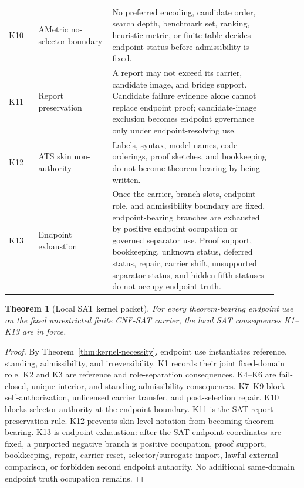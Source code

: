 \documentclass[11pt]{article}
\newtheorem{theorem}{Theorem}[section]
\theoremstyle{definition}
\theoremstyle{remark}
\begin{document}
\begin{longtable}{>{\raggedright\arraybackslash}p{0.10\linewidth}>{\raggedright\arraybackslash}p{0.25\linewidth}>{\raggedright\arraybackslash}p{0.56\linewidth}}
K10 & AMetric no-selector boundary & No preferred encoding, candidate order, search depth, benchmark set, ranking, heuristic metric, or finite table decides endpoint status before admissibility is fixed. \\
K11 & Report preservation & A report may not exceed its carrier, candidate image, and bridge support. Candidate failure evidence alone cannot replace endpoint proof; candidate-image exclusion becomes endpoint governance only under endpoint-resolving use. \\
K12 & ATS skin non-authority & Labels, syntax, model names, code orderings, proof sketches, and bookkeeping do not become theorem-bearing by being written. \\
K13 & Endpoint exhaustion & Once the carrier, branch slots, endpoint role, and admissibility boundary are fixed, endpoint-bearing branches are exhausted by positive endpoint occupation or governed separator use. Proof support, bookkeeping, unknown status, deferred status, repair, carrier shift, unsupported separator status, and hidden-fifth statuses do not occupy endpoint truth. \\
\bottomrule
\end{longtable}

\begin{theorem}[Local SAT kernel packet]\label{thm:local-sat-kernel-packet}
For every theorem-bearing endpoint use on the fixed unrestricted finite CNF-SAT carrier, the local SAT consequences K1--K13 are in force.
\end{theorem}

\begin{proof}
By Theorem~\ref{thm:kernel-necessity}, endpoint use instantiates reference, standing, admissibility, and irreversibility. K1 records their joint fixed-domain role. K2 and K3 are reference and role-separation consequences. K4--K6 are fail-closed, unique-interior, and standing-admissibility consequences. K7--K9 block self-authorization, unlicensed carrier transfer, and post-selection repair. K10 blocks selector authority at the endpoint boundary. K11 is the SAT report-preservation rule. K12 prevents skin-level notation from becoming theorem-bearing. K13 is endpoint exhaustion: after the SAT endpoint coordinates are fixed, a purported negative branch is positive occupation, proof support, bookkeeping, repair, carrier reset, selector/surrogate import, lawful external comparison, or forbidden second endpoint authority. No additional same-domain endpoint truth occupation remains.
\end{proof}
\end{document}
